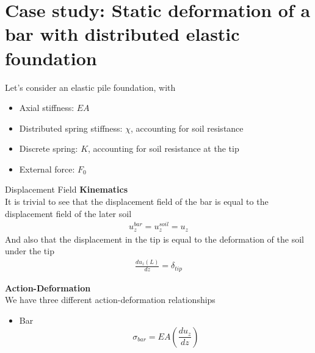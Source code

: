 \documentclass[a4paper, 11pt,article,oneside]{memoir}%
\begin{document}
\section{Case study: Static deformation of a bar with distributed
elastic foundation}
Let's consider an elastic pile foundation, with
\begin{itemize}
\item Axial stiffness: $EA$
\item Distributed spring stiffness: $\chi$, accounting for soil resistance 
\item Discrete spring: $K$, accounting for soil resistance at the tip
\item External force: $F_0$

\end{itemize}
\begin{exbox}{}{Displacement Field}
\textbf{Kinematics}\\
It is trivial to see that the displacement field of the bar is equal to the displacement field of the later soil 
\begin{align*}
u_z^{bar}=u_z^{soil}=u_z
\end{align*}
And also that the displacement in the tip is equal to the deformation of the soil under the tip
\begin{align*}
\frac{du_z(L)}{dz}=\delta_{tip}
\end{align*}

\textbf{Action-Deformation}\\
We have three different action-deformation relationships
\begin{itemize}
\item Bar\\
$$\sigma_{bar}=EA\left(\frac{du_z}{dz}\right)$$


\end{itemize}
\end{exbox}
\end{document}
